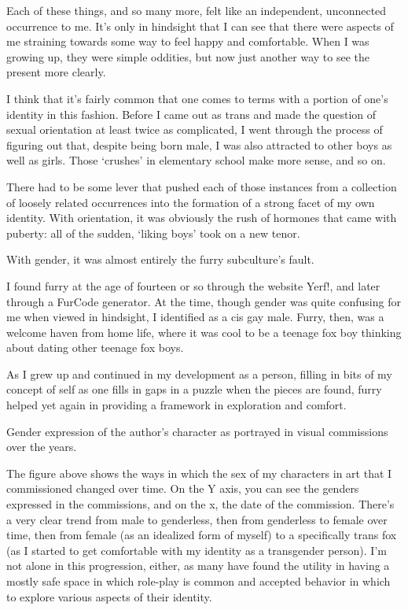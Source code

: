 Each of these things, and so many more, felt like an independent, unconnected occurrence to me. It's only in hindsight that I can see that there were aspects of me straining towards some way to feel happy and comfortable. When I was growing up, they were simple oddities, but now just another way to see the present more clearly.

I think that it's fairly common that one comes to terms with a portion of one's identity in this fashion. Before I came out as trans and made the question of sexual orientation at least twice as complicated, I went through the process of figuring out that, despite being born male, I was also attracted to other boys as well as girls. Those `crushes' in elementary school make more sense, and so on.

There had to be some lever that pushed each of those instances from a collection of loosely related occurrences into the formation of a strong facet of my own identity. With orientation, it was obviously the rush of hormones that came with puberty: all of the sudden, `liking boys' took on a new tenor.

With gender, it was almost entirely the furry subculture's fault.

I found furry at the age of fourteen or so through the website Yerf!, and later through a FurCode generator. At the time, though gender was quite confusing for me when viewed in hindsight, I identified as a cis gay male. Furry, then, was a welcome haven from home life, where it was cool to be a teenage fox boy thinking about dating other teenage fox boys.

As I grew up and continued in my development as a person, filling in bits of my concept of self as one fills in gaps in a puzzle when the pieces are found, furry helped yet again in providing a framework in exploration and comfort.

Gender expression of the author's character as portrayed in visual commissions over the years.

The figure above shows the ways in which the sex of my characters in art that I commissioned changed over time. On the Y axis, you can see the genders expressed in the commissions, and on the x, the date of the commission. There's a very clear trend from male to genderless, then from genderless to female over time, then from female (as an idealized form of myself) to a specifically trans fox (as I started to get comfortable with my identity as a transgender person). I'm not alone in this progression, either, as many have found the utility in having a mostly safe space in which role-play is common and accepted behavior in which to explore various aspects of their identity.


